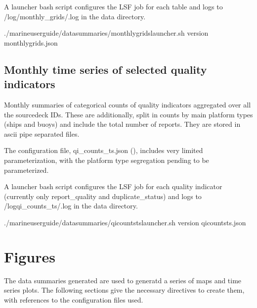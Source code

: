\documentclass[letterpaper,10pt,english]{sphinxmanual}
\begin{document}
A launcher bash script configures the LSF job for each table and logs to /log/monthly\_grids/.log in the data directory.

\begin{sphinxVerbatim}[commandchars=\\\{\}]
./marine\PYGZhy{}user\PYGZhy{}guide/data\PYGZus{}summaries/monthly\PYGZus{}grids\PYGZus{}launcher.sh version monthly\PYGZus{}grids.json
\end{sphinxVerbatim}


\section{Monthly time series of selected quality indicators}
\label{\detokenize{index:monthly-time-series-of-selected-quality-indicators}}
Monthly summaries of categorical counts of quality indicators aggregated over
all the source\sphinxhyphen{}deck IDs. These are additionally, split in counts by main
platform types (ships and buoys) and include the total number of reports. They
are stored in ascii pipe separated files.

The configuration file, qi\_counts\_ts.json ({\hyperref[\detokenize{index:qi-counts-config}]{}}), includes very limited parameterization, with the platform type segregation pending to be parameterized.

A launcher bash script configures the LSF job for each quality indicator (currently only report\_quality and duplicate\_status) and logs to /logqi\_counts\_ts/.log in the data directory.

\begin{sphinxVerbatim}[commandchars=\\\{\}]
./marine\PYGZhy{}user\PYGZhy{}guide/data\PYGZus{}summaries/qi\PYGZus{}counts\PYGZus{}ts\PYGZus{}launcher.sh version qi\PYGZus{}counts\PYGZus{}ts.json
\end{sphinxVerbatim}


\chapter{Figures}
\label{\detokenize{index:figures}}
The data summaries generated are used to generatd a series of maps and time series
plots. The following sections give the necessary directives to create them, with
references to the configuration files used.
\end{document}
